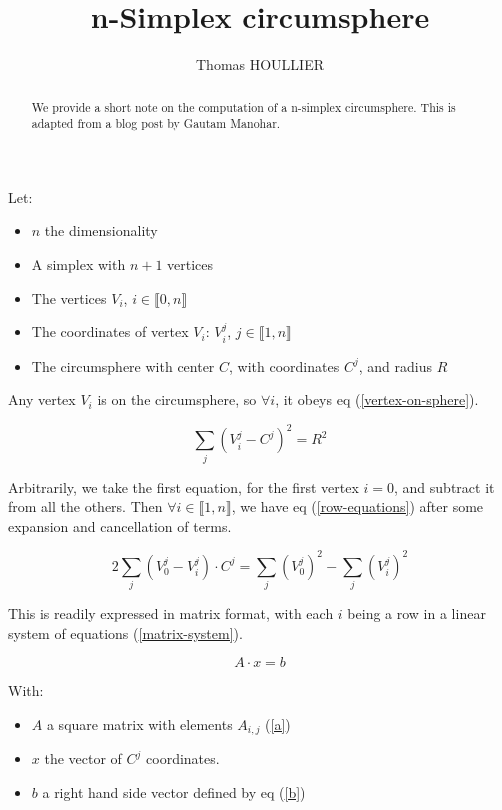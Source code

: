 \documentclass[]{article}
\title{n-Simplex circumsphere}
\author{Thomas HOULLIER}
\begin{document}
\maketitle

\begin{abstract}
We provide a short note on the computation of a n-simplex circumsphere. This is
adapted from a blog post by Gautam Manohar.
\end{abstract}

Let:
\begin{itemize}
\item $n$ the dimensionality
\item A simplex with $n+1$ vertices
\item The vertices $V_i$, $i\in \llbracket 0, n \rrbracket$
\item The coordinates of vertex $V_i$: $V_i^j$, $j\in\llbracket 1, n \rrbracket$
\item The circumsphere with center $C$, with coordinates $C^j$, and radius $R$
\end{itemize}

Any vertex $V_i$ is on the circumsphere, so $\forall i$, it obeys eq
(\ref{vertex-on-sphere}).

\begin{equation} \label{vertex-on-sphere}
\sum_j \left( V_i^j - C^j \right)^2 = R^2
\end{equation}

Arbitrarily, we take the first equation, for the first vertex $i=0$, and
subtract it from all the others. Then $\forall i \in \llbracket 1, n
\rrbracket$, we have eq (\ref{row-equations}) after some expansion and
cancellation of terms.

\begin{equation} \label{row-equations}
2 \sum_j \left( V_0^j - V_i^j \right) \cdot C^j =
  \sum_j \left( V_0^j \right)^2 - \sum_j \left( V_i^j \right)^2
\end{equation}

This is readily expressed in matrix format, with each $i$ being a row
in a linear system of equations (\ref{matrix-system}).

\begin{equation} \label{matrix-system}
A \cdot x = b
\end{equation}

With:
\begin{itemize}
\item $A$ a square matrix with elements $A_{i,j}$ (\ref{a})
\item $x$ the vector of $C^j$ coordinates.
\item $b$ a right hand side vector defined by eq (\ref{b})
\end{itemize}
\end{document}
